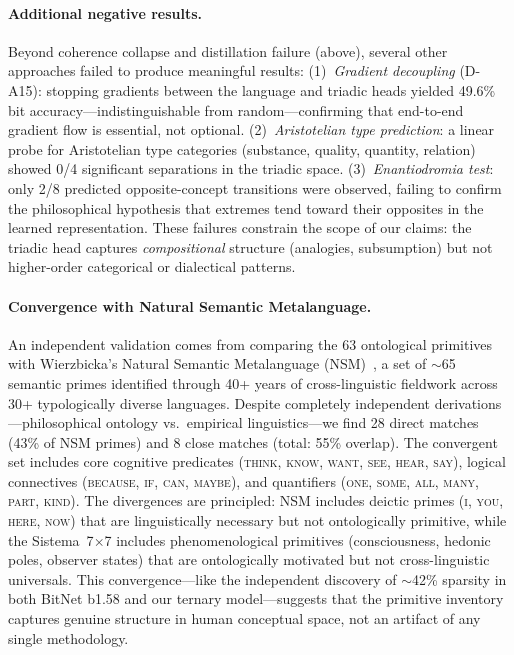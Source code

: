 \documentclass[11pt,a4paper]{article}
\begin{document}
\paragraph{Additional negative results.}
Beyond coherence collapse and distillation failure (above), several other approaches failed to produce meaningful results:
(1)~\emph{Gradient decoupling} (D-A15): stopping gradients between the language and triadic heads yielded 49.6\% bit accuracy---indistinguishable from random---confirming that end-to-end gradient flow is essential, not optional.
(2)~\emph{Aristotelian type prediction}: a linear probe for Aristotelian type categories (substance, quality, quantity, relation) showed 0/4 significant separations in the triadic space.
(3)~\emph{Enantiodromia test}: only 2/8 predicted opposite-concept transitions were observed, failing to confirm the philosophical hypothesis that extremes tend toward their opposites in the learned representation.
These failures constrain the scope of our claims: the triadic head captures \emph{compositional} structure (analogies, subsumption) but not higher-order categorical or dialectical patterns.

\paragraph{Convergence with Natural Semantic Metalanguage.}
An independent validation comes from comparing the 63 ontological primitives with Wierzbicka's Natural Semantic Metalanguage (NSM)~\citep{wierzbicka1996semantics}, a set of $\sim$65 semantic primes identified through 40+ years of cross-linguistic fieldwork across 30+ typologically diverse languages. Despite completely independent derivations---philosophical ontology vs.\ empirical linguistics---we find 28 direct matches (43\% of NSM primes) and 8 close matches (total: 55\% overlap). The convergent set includes core cognitive predicates (\textsc{think}, \textsc{know}, \textsc{want}, \textsc{see}, \textsc{hear}, \textsc{say}), logical connectives (\textsc{because}, \textsc{if}, \textsc{can}, \textsc{maybe}), and quantifiers (\textsc{one}, \textsc{some}, \textsc{all}, \textsc{many}, \textsc{part}, \textsc{kind}). The divergences are principled: NSM includes deictic primes (\textsc{i}, \textsc{you}, \textsc{here}, \textsc{now}) that are linguistically necessary but not ontologically primitive, while the Sistema~7$\times$7 includes phenomenological primitives (consciousness, hedonic poles, observer states) that are ontologically motivated but not cross-linguistic universals. This convergence---like the independent discovery of $\sim$42\% sparsity in both BitNet b1.58 and our ternary model---suggests that the primitive inventory captures genuine structure in human conceptual space, not an artifact of any single methodology.
\end{document}
